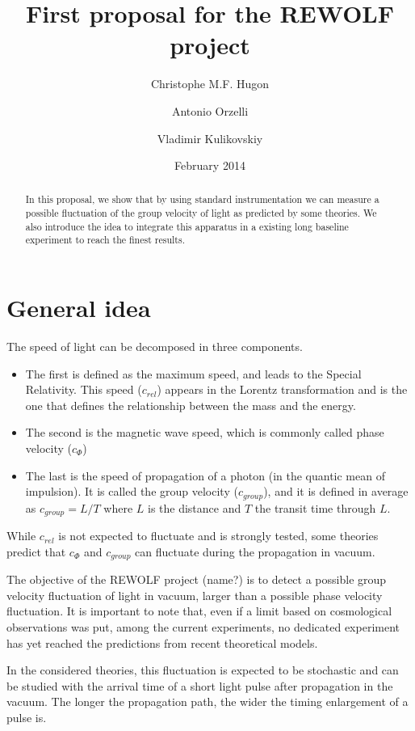 \documentclass[9pt, a4, twoside]{article}
\title{First proposal for the REWOLF project}
\author[1]{Christophe M.F. Hugon}
\author[1]{Antonio Orzelli}
\author[2]{Vladimir Kulikovskiy}
\affil[1]{INFN, Sezione di Genova}
\affil[2]{INFN, Sezione di Catania}
\date{February 2014}
\begin{document}
 
\maketitle
\begin{abstract}
In this proposal, we show that by using standard instrumentation we can  measure a possible fluctuation of the group velocity of light as predicted by some theories. We also introduce the idea to integrate this apparatus in a existing long baseline experiment to reach the finest results.
\end{abstract}

\section {General idea}
The speed of light can be decomposed in three components. 
\begin {itemize}
\item The first is defined as the maximum speed, and leads to the Special Relativity. This speed ($c_{rel}$) appears in the Lorentz transformation and is the one that defines the relationship between the mass and the energy.
\item The second is the magnetic wave speed, which is commonly called phase velocity ($c_{\Phi}$)
\item The last is the speed of propagation of a photon (in the quantic mean of impulsion). It is called the group velocity ($c_{group}$), and it is defined in average as $c_{group}=L/T$ where $L$ is the distance and $T$ the transit time through $L$.
\end {itemize}
While $c_{rel}$ is not expected to fluctuate and is strongly tested, some theories predict that $c_{\Phi}$ and $c_{group}$ can fluctuate during the propagation in vacuum.

The objective of the REWOLF project (name?) is to detect a possible group velocity fluctuation of light in vacuum, larger than a possible phase velocity fluctuation. It is important to note that, even if a limit based on cosmological observations was put, among the current experiments, no dedicated experiment has yet reached the predictions from recent theoretical models.

In the considered theories, this fluctuation is expected to be stochastic and can be studied with the arrival time of a short light pulse after propagation in the vacuum. The longer the propagation path, the wider the timing enlargement of a pulse is.
\end{document}
